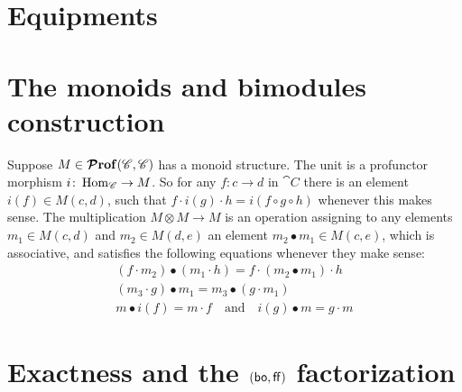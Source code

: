 \documentclass[12pt,oneside,article,draft]{memoir}
\begin{document}
\section{Equipments}

\section{The monoids and bimodules construction}


Suppose $M\in\bm{\mathcal{P}}\mathbf{rof}(\mathscr{C},\mathscr{C})$ has a monoid structure.  The unit is a profunctor morphism
$i\colon\operatorname{Hom}_{\mathscr{C}}\to M$.  So for any $f\colon c\to d$ in $\cat{C}$ there is an element
$i(f)\in M(c,d)$, such that $f\cdot i(g)\cdot h = i(f\circ g\circ h)$ whenever this makes sense.
The multiplication $M\otimes M\to M$ is an operation assigning to any elements $m_1\in M(c,d)$ and
$m_2\in M(d,e)$ an element $m_2\bullet m_1\in M(c,e)$, which is associative, and satisfies the
following equations whenever they make sense:
\begin{gather*}
   (f\cdot m_2)\bullet(m_1\cdot h) = f\cdot(m_2\bullet m_1)\cdot h
   \\ (m_3\cdot g)\bullet m_1 = m_3\bullet(g\cdot m_1)
   \\ m\bullet i(f) = m\cdot f
         \quad\text{and}\quad
      i(g)\bullet m = g\cdot m
\end{gather*}


\section{Exactness and the $(\mathsf{bo},\mathsf{ff})$ factorization}
\end{document}
